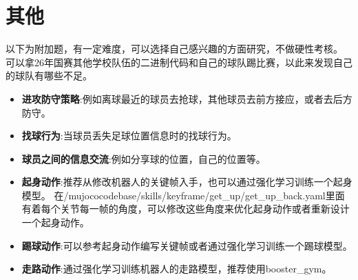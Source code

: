 \documentclass[11pt, UTF8, a4paper]{ctexart} %
\begin{document}
\section{其他}
以下为附加题，有一定难度，可以选择自己感兴趣的方面研究，不做硬性考核。
\smallbreak
可以拿26年国赛其他学校队伍的二进制代码和自己的球队踢比赛，以此来发现自己的球队有哪些不足。
\begin{itemize}
    \item \textbf{进攻防守策略}:例如离球最近的球员去抢球，其他球员去前方接应，或者去后方防守。
    \item \textbf{找球行为}:当球员丢失足球位置信息时的找球行为。
    \item \textbf{球员之间的信息交流}:例如分享球的位置，自己的位置等。
    \item \textbf{起身动作}:推荐从修改机器人的关键帧入手，也可以通过强化学习训练一个起身模型。
        \smallbreak 
        在/mujococodebase/skills/keyframe/get\_up/get\_up\_back.yaml里面有着每个关节每一帧的角度，可以修改这些角度来优化起身动作或者重新设计一个起身动作。
    \item \textbf{踢球动作}:可以参考起身动作编写关键帧或者通过强化学习训练一个踢球模型。
    \item \textbf{走路动作}:通过强化学习训练机器人的走路模型，推荐使用booster\_gym。
\end{itemize}
\end{document}
